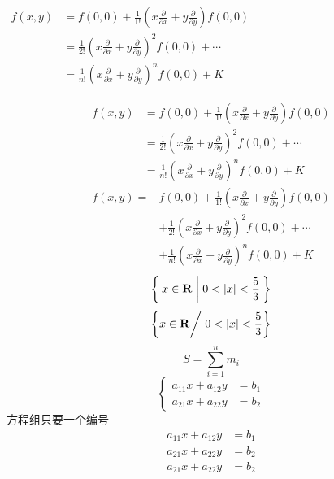 		\begin{flushleft}
			$
			\begin{aligned}
				f(x,y) &= f(0,0) + \frac{1}{1!}\left(x\frac{\partial}{\partial x}+y\frac{\partial}{\partial y}\right)f(0,0) \\
				&= \frac{1}{2!}\left(x\frac{\partial}{\partial x}+y\frac{\partial}{\partial y}\right)^2f(0,0) + \cdots\\
				&= \frac{1}{n!}\left(x\frac{\partial}{\partial x}+y\frac{\partial}{\partial y}\right)^nf(0,0) + K
			\end{aligned}
			$
		\end{flushleft}
		
		\[
		\begin{aligned}
			f(x,y) &= f(0,0) + \frac{1}{1!}\left(x\frac{\partial}{\partial x}+y\frac{\partial}{\partial y}\right)f(0,0) \\
			&= \frac{1}{2!}\left(x\frac{\partial}{\partial x}+y\frac{\partial}{\partial y}\right)^2f(0,0) + \cdots\\
			&= \frac{1}{n!}\left(x\frac{\partial}{\partial x}+y\frac{\partial}{\partial y}\right)^nf(0,0) + K
		\end{aligned}
		\]
		\begin{equation}\label{eq:a}
			\begin{split}
				f(x,y) =& f(0,0) + \frac{1}{1!}\left(x\frac{\partial}{\partial x}+y\frac{\partial}{\partial y}\right)f(0,0) \\
				& + \frac{1}{2!}\left(x\frac{\partial}{\partial x}+y\frac{\partial}{\partial y}\right)^2f(0,0) + \cdots\\
				& + \frac{1}{n!}\left(x\frac{\partial}{\partial x}+y\frac{\partial}{\partial y}\right)^nf(0,0) + K
			\end{split}
		\end{equation}
		\[ \Set{x\in\mathbf{R} | 0<|x|<\frac{5}{3}} \]
		\[
		\left\{\vphantom{\frac{5}{3}}x\in\mathbf{R} \right/\left.
		0<{|x|}<\frac{5}{3}\right \}
		\]
		$$S = \sum_{i=1}^n m_i$$
		\[\left\{
		\begin{aligned}
			a_{11}x + a_{12}y &= b_1 \\
			a_{21}x + a_{22}y &= b_2
		\end{aligned}
		\right.
		\]
		方程组只要一个编号
		\begin{equation}
			\begin{aligned}
				a_{11}x + a_{12}y &= b_1 \\
				a_{21}x + a_{22}y &= b_2\\
				a_{21}x + a_{22}y &= b_2
			\end{aligned}
		\end{equation}

